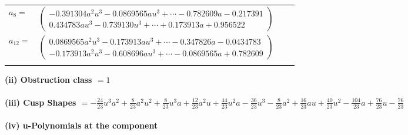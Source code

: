 \documentclass[1p]{elsarticle_modified}
\theoremstyle{definition}
\begin{document}
\begin{tabular}{m{7pt} m{180pt} m{7pt} m{180pt} }
\flushright $a_{8}=$&$\begin{pmatrix}-0.391304 a^{2} u^{3}-0.0869565 a u^{3}+\cdots-0.782609 a-0.217391\\0.434783 a u^{3}-0.739130 u^{3}+\cdots+0.173913 a+0.956522\end{pmatrix}$ \\
\flushright $a_{12}=$&$\begin{pmatrix}0.0869565 a^{2} u^{3}-0.173913 a u^{3}+\cdots-0.347826 a-0.0434783\\-0.173913 a^{2} u^{3}-0.608696 a u^{3}+\cdots-0.0869565 a+0.782609\end{pmatrix}$\\&\end{tabular}
\flushleft \textbf{(ii) Obstruction class $= 1$}\\~\\
\flushleft \textbf{(iii) Cusp Shapes $= -\frac{24}{23} u^3 a^2+\frac{8}{23} a^2 u^2+\frac{8}{23} u^3 a+\frac{12}{23} a^2 u+\frac{44}{23} u^2 a-\frac{36}{23} u^3-\frac{8}{23} a^2+\frac{16}{23} a u+\frac{40}{23} u^2-\frac{104}{23} a+\frac{76}{23} u-\frac{76}{23}$}\\~\\
\newpage\renewcommand{\arraystretch}{1}
\flushleft \textbf{(iv) u-Polynomials at the component}\newline \\
\end{document}
